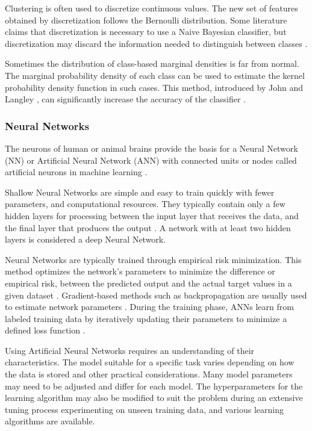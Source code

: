 \documentclass[sn-mathphys-num]{sn-jnl}%
\begin{document}
Clustering is often used to discretize continuous values. The new set of features obtained by discretization follows the Bernoulli distribution. Some literature claims that discretization is necessary to use a Naive Bayesian classifier, but discretization may discard the information needed to distinguish between classes \cite{Hand2001}.

Sometimes the distribution of class-based marginal densities is far from normal. The marginal probability density of each class can be used to estimate the kernel probability density function in such cases. This method, introduced by John and Langley \cite{John2013}, can significantly increase the accuracy of the classifier \cite{Piryonesi2020, HastieRosset2009}.

\subsubsection{Neural Networks}

The neurons of human or animal brains provide the basis for a Neural Network (NN) or Artificial Neural Network (ANN) with connected units or nodes called artificial neurons in machine learning \cite{mitExplainedNeural, brahme2014comprehensive}. 

Shallow Neural Networks are simple and easy to train quickly with fewer parameters, and computational resources. They typically contain only a few hidden layers for processing between the input layer that receives the data, and the final layer that produces the output \cite{olden2002illuminating, ozesmi1999artificial}.  A network with at least two hidden layers \cite{bishop2006pattern} is considered a deep Neural Network.

Neural Networks are typically trained through empirical risk minimization. This method optimizes the network's parameters to minimize the difference or empirical risk, between the predicted output and the actual target values in a given dataset \cite{vapnik2013nature}. Gradient-based methods such as backpropagation are usually used to estimate network parameters  \cite{vapnik2013nature}. During the training phase, ANNs learn from labeled training data by iteratively updating their parameters to minimize a defined loss function \cite{goodfellow2016deep}.

Using Artificial Neural Networks requires an understanding of their characteristics. The model suitable for a specific task varies depending on how the data is stored and other practical considerations. Many model parameters may need to be adjusted and differ for each model. The hyperparameters for the learning algorithm may also be modified to suit the problem \cite{probst2019tunability} during an extensive tuning process experimenting on unseen training data, and various learning algorithms are available.
\end{document}
